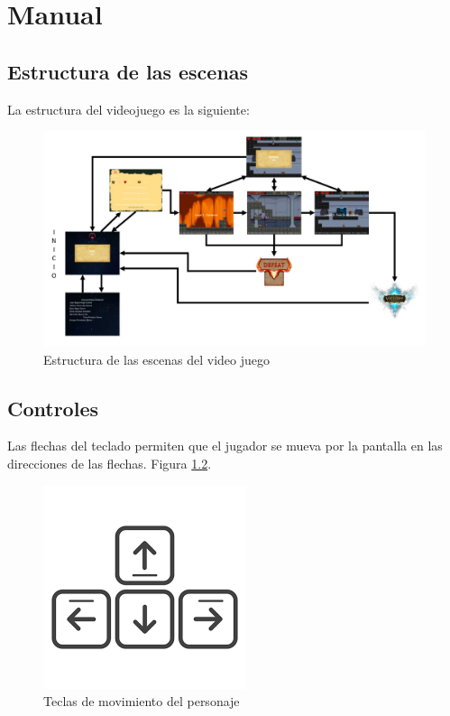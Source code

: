 \chapter{Manual}

\section{Estructura de las escenas}

La estructura del videojuego es la siguiente: 

\begin{figure}[H]
	\centering
	\includegraphics[scale=0.50]{imagenes/Estructura_escena.png}
	\caption{\label{fig:Estructura_escena}Estructura de las escenas del video juego}
\end{figure}

\section{Controles}

Las flechas del teclado permiten que el jugador se mueva por la pantalla en las direcciones de las flechas. Figura \ref{fig:flechasTeclado}.

\begin{figure}[H]
	\centering
	\includegraphics[scale=0.50]{imagenes/flechas_teclado.png}
	\caption{\label{fig:flechasTeclado}Teclas de movimiento del personaje}
\end{figure}

